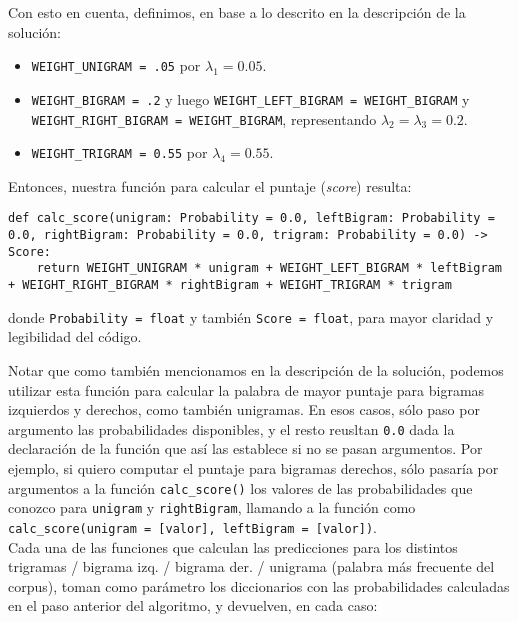 \documentclass[a4paper]{article}
\begin{document}
Con esto en cuenta, definimos, en base a lo descrito en la descripción de la solución:

\begin{itemize}
    \item \texttt{WEIGHT_UNIGRAM = .05} por $\lambda_1 = 0.05$.
    \item \texttt{WEIGHT_BIGRAM = .2} y luego \texttt{WEIGHT\_LEFT\_BIGRAM = WEIGHT\_BIGRAM} y \texttt{WEIGHT\_RIGHT\_BIGRAM = WEIGHT\_BIGRAM}, representando $\lambda_2 = \lambda_3 = 0.2$.
    \item \texttt{WEIGHT_TRIGRAM = 0.55} por $\lambda_4 = 0.55$.
\end{itemize}

Entonces, nuestra función para calcular el puntaje (\textit{score}) resulta:

\begin{verbatim}
def calc_score(unigram: Probability = 0.0, leftBigram: Probability = 0.0, rightBigram: Probability = 0.0, trigram: Probability = 0.0) -> Score:
    return WEIGHT_UNIGRAM * unigram + WEIGHT_LEFT_BIGRAM * leftBigram + WEIGHT_RIGHT_BIGRAM * rightBigram + WEIGHT_TRIGRAM * trigram
\end{verbatim}

\noindent donde \texttt{Probability = float} y también \texttt{Score = float}, para mayor claridad y legibilidad del código.

Notar que como también mencionamos en la descripción de la solución, podemos utilizar esta función para calcular la palabra de mayor puntaje para bigramas izquierdos y derechos, como también unigramas. En esos casos, sólo paso por argumento las probabilidades disponibles, y el resto reusltan \texttt{0.0} dada la declaración de la función que así las establece si no se pasan argumentos. Por ejemplo, si quiero computar el puntaje para bigramas derechos, sólo pasaría por argumentos a la función \texttt{calc_score()} los valores de las probabilidades que conozco para \texttt{unigram} y \texttt{rightBigram}, llamando a la función como \texttt{calc_score(unigram = [valor], leftBigram = [valor])}. \\

Cada una de las funciones que calculan las predicciones para los distintos trigramas / bigrama izq. / bigrama der. / unigrama (palabra más frecuente del corpus), toman como parámetro los diccionarios con las probabilidades calculadas en el paso anterior del algoritmo, y devuelven, en cada caso:
\end{document}
